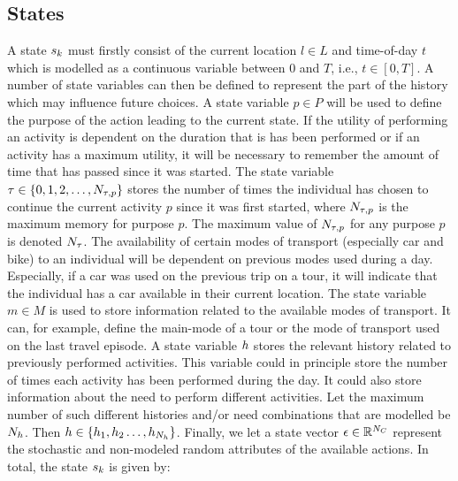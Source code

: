 \subsection{States}
 A state $s_{k}$ must firstly consist of the current location $l \in L$ and time-of-day $t$ which is modelled as a continuous variable between 0 and $T$, i.e., $t\in [0,T]$. A number of state variables can then be defined to represent the part of the history which may influence future choices. 
A state variable $p \in P$ will be used to define the purpose of the action leading to the current state. If the utility of performing an activity is dependent on the duration that is has been performed or if an activity has a maximum utility, it will be necessary to remember the amount of time that has passed since it was started. The state variable $\tau \in \{0,1,2,\dots,N_{\tau,p} \}$ stores the number of times the individual has chosen to continue the current activity $p$ since it was first started, where $N_{\tau,p}$ is the maximum memory for purpose $p$. The maximum value of $N_{\tau,p}$ for any purpose $p$ is denoted $N_\tau$. The availability of certain modes of transport (especially car and bike) to an individual will be dependent on previous modes used during a day. Especially, if a car was used on the previous trip on a tour, it will indicate that the individual has a car available in their current location. The state variable $m \in M$ is used to store information related to the available modes of transport. It can, for example, define the main-mode of a tour or the mode of transport used on the last travel episode.
A state variable $h$ stores the relevant history related to previously performed activities. This variable could in principle store the number of times each activity has been performed during the day. It could also store information about the need to perform different activities. Let the maximum number of such different histories and/or need combinations that are modelled be $N_h$. Then $h\in\{h_1,h_2\dots,h_{N_h} \}$. Finally, we let a state vector $\epsilon \in \mathbb{R}^{N_C}$ represent the stochastic and non-modeled random attributes of the available actions. In total, the state $s_{k}$ is given by:

